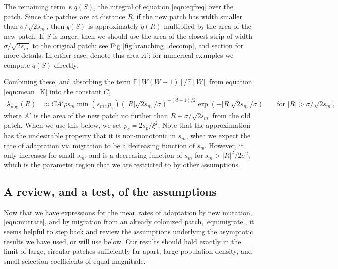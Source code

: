 \documentclass[10pt,letterpaper]{article}
\newcommand{\E}{\mathbb{E}}
\newcommand{\migrate}{\lambda_\text{mig}}
\newcommand{\secref}[1]{{\emph{\nameref{#1}}}}
\begin{document}
The remaining term is $q(S)$, the integral of equation \eqref{eqn:eqfreq} over the patch.
Since the patches are at distance $R$,
if the new patch has width smaller than $\sigma/\sqrt{2s_m}$, 
then $q(S)$ is approximately $q(R)$ multiplied by the area of the new patch.
If $S$ is larger, then we should use the area of the closest strip
of width $\sigma/\sqrt{2s_m}$ to the original patch;
see Fig \ref{fig:branching_decomp}, and section \secref{apx:qS} for more details.
In either case, denote this area $A'$;
for numerical examples we compute $q(S)$ directly.


Combining these, and absorbing the term $\E[W(W-1)]/\E[W]$ from equation \eqref{eqn:mean_K} 
into the constant $C$,
\begin{align} \label{eqn:migrate}
  \migrate(R) &\approx C A' \rho s_m \min(s_m,p_e) \left( |R| \sqrt{2 s_m}/\sigma \right)^{-(d-1)/2} \exp( - |R| \sqrt{2 s_m} / \sigma)  \qquad \text{for } |R| > \sigma/\sqrt{2 s_m}  ,
\end{align}
where $A'$ is the area of the new patch no further than $R+\sigma/\sqrt{2s_m}$
from the old patch.
When we use this below, we set $p_e = 2 s_p / \xi^2$.
Note that the approximation has the undesirable property that it is
non-monotonic in $s_m$, when we expect the rate of adaptation via
migration to be a decreasing function of $s_m$. However, it only increases for small $s_m$, 
and is a decreasing function of $s_m$ for $s_m > |R|^2 / 2 \sigma^2$, 
which is the parameter region that we are restricted to by other assumptions.


\subsection{A review, and a test, of the assumptions}
\label{ss:assumptions}

Now that we have expressions for the mean rates of adaptation by new mutation, \eqref{eqn:mutrate},
and by migration from an already colonized patch, \eqref{eqn:migrate},
it seems helpful to step back and review the assumptions 
underlying the asymptotic results we have used, or will use below.
Our results should hold exactly in the limit of 
large, circular patches sufficiently far apart,
large population density,
and small selection coefficients of equal magnitude.
\end{document}
